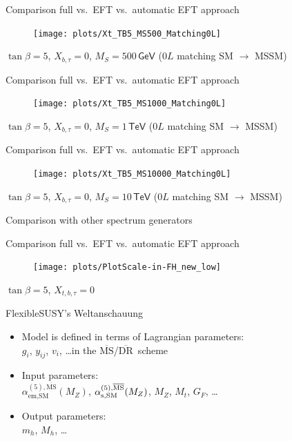 \documentclass[hyperref={pdfpagelabels=false},ngerman]{beamer}
\newcommand{\eh}[1]{\,\mathsf{#1}}
\newcommand{\DRbar}{\ensuremath{\overline{\text{DR}}}}
\newcommand{\MSbar}{\ensuremath{\overline{\text{MS}}}}
\begin{document}
\begin{frame}[noframenumbering]{Comparison full vs.\ EFT vs.\ automatic EFT approach}
  \begin{figure}
    \centering
    \texttt{[image: plots/Xt\_TB5\_MS500\_Matching0L]}
  \end{figure}
  $\tan\beta = 5$, $X_{b,\tau} = 0$, $M_S = 500\eh{GeV}$ ($0L$ matching SM $\rightarrow$ MSSM)
\end{frame}

\begin{frame}[noframenumbering]{Comparison full vs.\ EFT vs.\ automatic EFT approach}
  \begin{figure}
    \centering
    \texttt{[image: plots/Xt\_TB5\_MS1000\_Matching0L]}
  \end{figure}
  $\tan\beta = 5$, $X_{b,\tau} = 0$, $M_S = 1\eh{TeV}$ ($0L$ matching SM $\rightarrow$ MSSM)
\end{frame}

\begin{frame}[noframenumbering]{Comparison full vs.\ EFT vs.\ automatic EFT approach}
  \begin{figure}
    \centering
    \texttt{[image: plots/Xt\_TB5\_MS10000\_Matching0L]}
  \end{figure}
  $\tan\beta = 5$, $X_{b,\tau} = 0$, $M_S = 10\eh{TeV}$ ($0L$ matching SM $\rightarrow$ MSSM)
\end{frame}

\begin{frame}[noframenumbering]
  \begin{center}
    \Large Comparison with other spectrum generators
  \end{center}
\end{frame}

\begin{frame}[noframenumbering]{Comparison full vs.\ EFT vs.\ automatic EFT approach}
  \begin{figure}
    \centering
    \texttt{[image: plots/PlotScale-in-FH\_new\_low]}
  \end{figure}
  $\tan\beta = 5$, $X_{t,b,\tau} = 0$
\end{frame}

\begin{frame}[noframenumbering]{FlexibleSUSY's Weltanschauung}
  \begin{itemize} \setlength\itemsep{2em}
  \item Model is defined in terms of Lagrangian parameters:\\
    $g_i$, $y_{ij}$, $v_i$, \ldots in the \MSbar/\DRbar\ scheme
  \item Input parameters:\\
    $\alpha_{\text{em},\text{SM}}^{(5),\MSbar}(M_Z)$,
    $\alpha_{\text{s},\text{SM}}^{(5),\text{\MSbar}}(M_Z)$, $M_Z$,
    $M_t$, $G_F$, \ldots
  \item Output parameters:\\ $m_h$, $M_h$, \ldots
  \end{itemize}
\end{frame}
\end{document}
